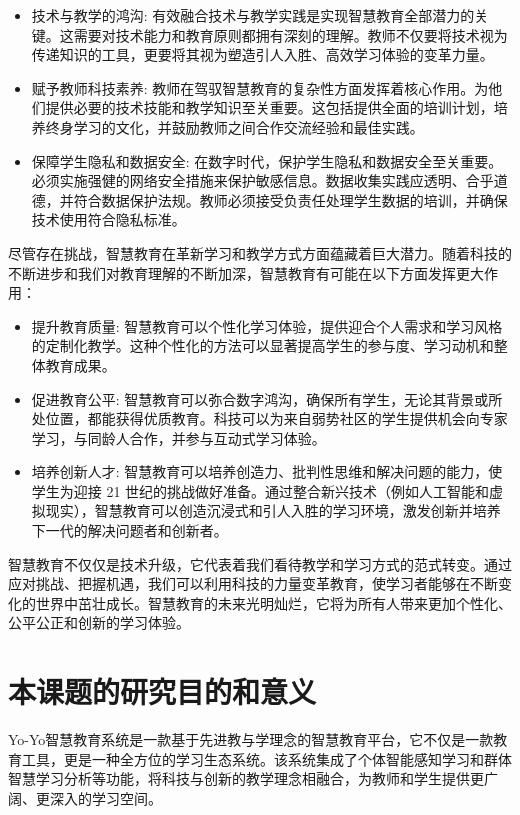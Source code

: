 \documentclass[oneside]{xduugthesis}
\begin{document}
\begin{itemize}[nosep]
    \item 技术与教学的鸿沟: 有效融合技术与教学实践是实现智慧教育全部潜力的关键。这需要对技术能力和教育原则都拥有深刻的理解。教师不仅要将技术视为传递知识的工具，更要将其视为塑造引人入胜、高效学习体验的变革力量。
    \item 赋予教师科技素养: 教师在驾驭智慧教育的复杂性方面发挥着核心作用。为他们提供必要的技术技能和教学知识至关重要。这包括提供全面的培训计划，培养终身学习的文化，并鼓励教师之间合作交流经验和最佳实践。
    \item 保障学生隐私和数据安全: 在数字时代，保护学生隐私和数据安全至关重要。必须实施强健的网络安全措施来保护敏感信息。数据收集实践应透明、合乎道德，并符合数据保护法规。教师必须接受负责任处理学生数据的培训，并确保技术使用符合隐私标准。
\end{itemize}

尽管存在挑战，智慧教育在革新学习和教学方式方面蕴藏着巨大潜力。随着科技的不断进步和我们对教育理解的不断加深，智慧教育有可能在以下方面发挥更大作用：

\begin{itemize}[nosep]
    \item 提升教育质量: 智慧教育可以个性化学习体验，提供迎合个人需求和学习风格的定制化教学。这种个性化的方法可以显著提高学生的参与度、学习动机和整体教育成果。
    \item 促进教育公平: 智慧教育可以弥合数字鸿沟，确保所有学生，无论其背景或所处位置，都能获得优质教育。科技可以为来自弱势社区的学生提供机会向专家学习，与同龄人合作，并参与互动式学习体验。
    \item 培养创新人才: 智慧教育可以培养创造力、批判性思维和解决问题的能力，使学生为迎接 21 世纪的挑战做好准备。通过整合新兴技术（例如人工智能和虚拟现实），智慧教育可以创造沉浸式和引人入胜的学习环境，激发创新并培养下一代的解决问题者和创新者。
\end{itemize}

智慧教育不仅仅是技术升级，它代表着我们看待教学和学习方式的范式转变。通过应对挑战、把握机遇，我们可以利用科技的力量变革教育，使学习者能够在不断变化的世界中茁壮成长。智慧教育的未来光明灿烂，它将为所有人带来更加个性化、公平公正和创新的学习体验。

\section{本课题的研究目的和意义}

Yo-Yo智慧教育系统是一款基于先进教与学理念的智慧教育平台，它不仅是一款教育工具，更是一种全方位的学习生态系统。该系统集成了个体智能感知学习和群体智慧学习分析等功能，将科技与创新的教学理念相融合，为教师和学生提供更广阔、更深入的学习空间。
\end{document}
